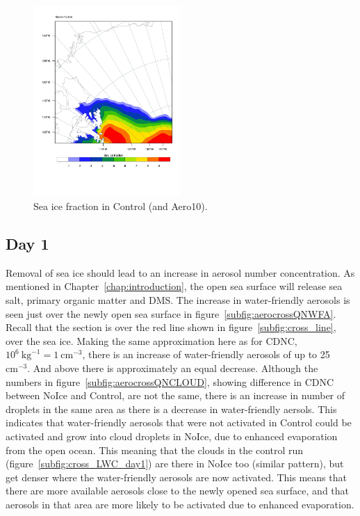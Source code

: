 \begin{figure}[hb]
\centering
\includegraphics[width=0.5\textwidth]{results/control/seaiceplot.pdf}
\caption{Sea ice fraction in Control (and Aero10).}
\label{fig:seaice}
\end{figure}

\subsection{Day 1}
\label{sec:noiceDay1}
Removal of sea ice should lead to an increase in aerosol number concentration. As mentioned in Chapter~\ref{chap:introduction}, the open sea surface will release sea salt, primary organic matter and DMS. The increase in water-friendly aerosols is seen just over the newly open sea surface in figure~\ref{subfig:aerocrossQNWFA}. Recall that the section is over the red line shown in figure~\ref{subfig:cross_line}, over the sea ice. Making the same approximation here as for CDNC, $10^6~\text{kg}^{-1}=1~\text{cm}^{-3}$, there is an increase of water-friendly aerosols of up to 25~$\text{cm}^{-3}$. And above there is approximately an equal decrease. Although the numbers in figure~\ref{subfig:aerocrossQNCLOUD}, showing difference in CDNC between NoIce and Control, are not the same, there is an increase in number of droplets in the same area as there is a decrease in water-friendly aersols. This indicates that water-friendly aerosols that were not activated in Control could be activated and grow into cloud droplets in NoIce, due to enhanced evaporation from the open ocean. This meaning that the clouds in the control run (figure~\ref{subfig:cross_LWC_day1}) are there in NoIce too (similar pattern), but get denser where the water-friendly aerosols are now activated. This means that there are more available aerosols close to the newly opened sea surface, and that aerosols in that area are more likely to be activated due to enhanced evaporation.

